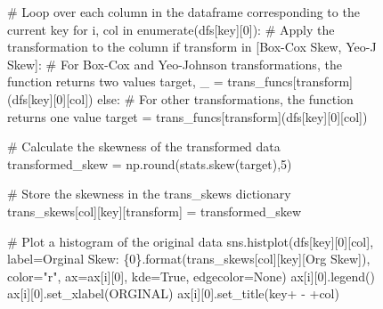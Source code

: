 \documentclass[
  letterpaper,
  DIV=11,
  numbers=noendperiod,
  oneside]{scrartcl}
\newenvironment{Shaded}{\begin{snugshade}}{\end{snugshade}}
\newcommand{\BuiltInTok}[1]{\textcolor[rgb]{0.00,0.23,0.31}{#1}}
\newcommand{\CommentTok}[1]{\textcolor[rgb]{0.37,0.37,0.37}{#1}}
\newcommand{\ControlFlowTok}[1]{\textcolor[rgb]{0.00,0.23,0.31}{#1}}
\newcommand{\DecValTok}[1]{\textcolor[rgb]{0.68,0.00,0.00}{#1}}
\newcommand{\KeywordTok}[1]{\textcolor[rgb]{0.00,0.23,0.31}{#1}}
\newcommand{\NormalTok}[1]{\textcolor[rgb]{0.00,0.23,0.31}{#1}}
\newcommand{\OperatorTok}[1]{\textcolor[rgb]{0.37,0.37,0.37}{#1}}
\newcommand{\SpecialCharTok}[1]{\textcolor[rgb]{0.37,0.37,0.37}{#1}}
\newcommand{\StringTok}[1]{\textcolor[rgb]{0.13,0.47,0.30}{#1}}
\newcommand{\VariableTok}[1]{\textcolor[rgb]{0.07,0.07,0.07}{#1}}
\begin{document}
\begin{figure}
{\begin{Shaded}
\begin{Highlighting}[]
        \CommentTok{\# Loop over each column in the dataframe corresponding to the current key}
        \ControlFlowTok{for}\NormalTok{ i, col }\KeywordTok{in} \BuiltInTok{enumerate}\NormalTok{(dfs[key][}\DecValTok{0}\NormalTok{]):}
            \CommentTok{\# Apply the transformation to the column}
            \ControlFlowTok{if}\NormalTok{ transform }\KeywordTok{in}\NormalTok{ [}\StringTok{\textquotesingle{}Box{-}Cox Skew\textquotesingle{}}\NormalTok{, }\StringTok{\textquotesingle{}Yeo{-}J Skew\textquotesingle{}}\NormalTok{]:}
                \CommentTok{\# For Box{-}Cox and Yeo{-}Johnson transformations, the function returns two values}
\NormalTok{                target, \_ }\OperatorTok{=}\NormalTok{ trans\_funcs[transform](dfs[key][}\DecValTok{0}\NormalTok{][col])}
            \ControlFlowTok{else}\NormalTok{:}
                \CommentTok{\# For other transformations, the function returns one value}
\NormalTok{                target }\OperatorTok{=}\NormalTok{ trans\_funcs[transform](dfs[key][}\DecValTok{0}\NormalTok{][col])}

            \CommentTok{\# Calculate the skewness of the transformed data}
\NormalTok{            transformed\_skew }\OperatorTok{=}\NormalTok{ np.}\BuiltInTok{round}\NormalTok{(stats.skew(target),}\DecValTok{5}\NormalTok{)}

            \CommentTok{\# Store the skewness in the \textquotesingle{}trans\_skews\textquotesingle{} dictionary}
\NormalTok{            trans\_skews[col][key][transform] }\OperatorTok{=}\NormalTok{ transformed\_skew}

            \CommentTok{\# Plot a histogram of the original data}
\NormalTok{            sns.histplot(dfs[key][}\DecValTok{0}\NormalTok{][col], label}\OperatorTok{=}\StringTok{\textquotesingle{}Orginal Skew: }\SpecialCharTok{\{0\}}\StringTok{\textquotesingle{}}\NormalTok{.}\BuiltInTok{format}\NormalTok{(trans\_skews[col][key][}\StringTok{\textquotesingle{}Org Skew\textquotesingle{}}\NormalTok{]), color}\OperatorTok{=}\StringTok{"r"}\NormalTok{, ax}\OperatorTok{=}\NormalTok{ax[i][}\DecValTok{0}\NormalTok{], kde}\OperatorTok{=}\VariableTok{True}\NormalTok{, edgecolor}\OperatorTok{=}\VariableTok{None}\NormalTok{)}
\NormalTok{            ax[i][}\DecValTok{0}\NormalTok{].legend()}
\NormalTok{            ax[i][}\DecValTok{0}\NormalTok{].set\_xlabel(}\StringTok{\textquotesingle{}ORGINAL\textquotesingle{}}\NormalTok{)}
\NormalTok{            ax[i][}\DecValTok{0}\NormalTok{].set\_title(key}\OperatorTok{+}\StringTok{\textquotesingle{} {-} \textquotesingle{}}\OperatorTok{+}\NormalTok{col)}


\end{Highlighting}
\end{Shaded}}
\end{figure}
\end{document}
